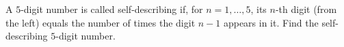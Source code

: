 A $5$-digit number is called self-describing if, for $n=1,\dots,5$, its $n$-th digit (from the left) equals the number of times the digit $n-1$ appears in it. Find the self-describing $5$-digit number.
